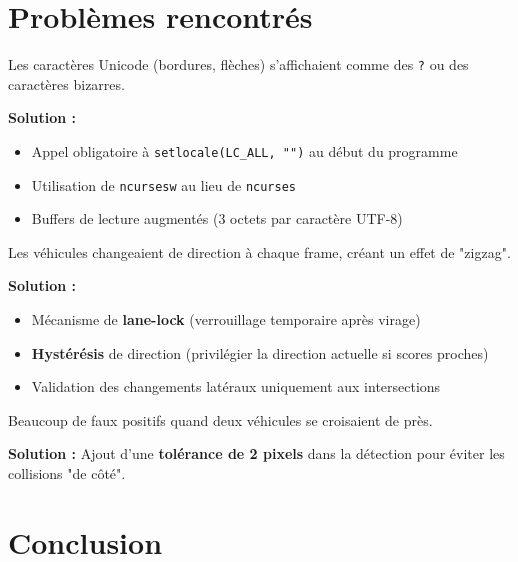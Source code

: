 \documentclass[11pt,a4paper]{article}
\newcommand{\keyword}[1]{\textcolor{primary}{\textbf{#1}}}
\newcommand{\code}[1]{\texttt{\textcolor{accent}{#1}}}
\begin{document}
\section{Problèmes rencontrés}

\begin{warningbox}
Les caractères Unicode (bordures, flèches) s'affichaient comme des \texttt{?} ou des caractères bizarres.

\textbf{Solution :}
\begin{itemize}[noitemsep]
    \item Appel obligatoire à \code{setlocale(LC\_ALL, "")} au début du programme
    \item Utilisation de \code{ncursesw} au lieu de \code{ncurses}
    \item Buffers de lecture augmentés (3 octets par caractère UTF-8)
\end{itemize}
\end{warningbox}

\begin{warningbox}
Les véhicules changeaient de direction à chaque frame, créant un effet de "zigzag".

\textbf{Solution :}
\begin{itemize}[noitemsep]
    \item Mécanisme de \keyword{lane-lock} (verrouillage temporaire après virage)
    \item \keyword{Hystérésis} de direction (privilégier la direction actuelle si scores proches)
    \item Validation des changements latéraux uniquement aux intersections
\end{itemize}
\end{warningbox}

\begin{warningbox}
Beaucoup de faux positifs quand deux véhicules se croisaient de près.

\textbf{Solution :} Ajout d'une \keyword{tolérance de 2 pixels} dans la détection pour éviter les collisions "de côté".
\end{warningbox}

\section{Conclusion}
\end{document}
